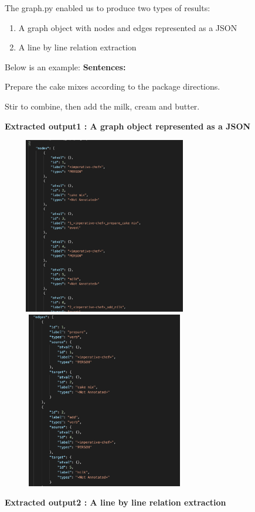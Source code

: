 \documentclass[11pt,letterpaper]{article}
\begin{document}
\noindent
The graph.py enabled us to produce two types of results:
\begin{enumerate}
    \item A graph object with nodes and edges represented as a JSON 
    \item A line by line relation extraction
\end{enumerate}
\noindent
Below is an example:
\noindent \newline
\textbf{Sentences:} 

Prepare the cake mixes according to the package directions.

Stir to combine, then add the milk, cream and butter.

\noindent 
\textbf{Extracted output1 : A graph object represented as a JSON } 
\newline

\includegraphics[width=9cm, height=7.75cm]{graph_obj1.png}
\includegraphics[width=9cm, height=7.75cm]{graph_obj2.png}

\noindent
\textbf{Extracted output2 : A line by line relation extraction } 
\end{document}
